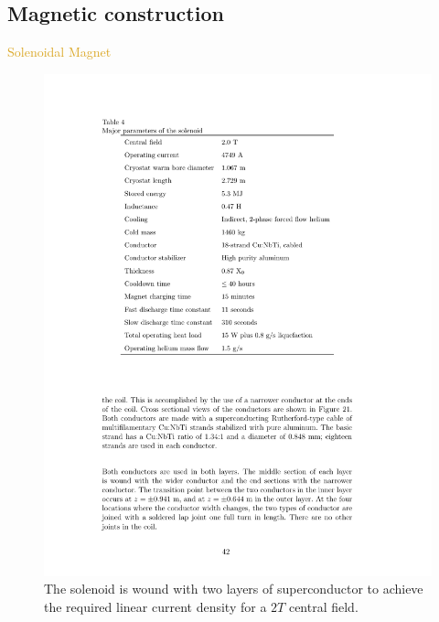 \subsection{Magnetic construction}
\begin{frame}{\textcolor{Goldenrod}{Solenoidal Magnet }}
    \begin{figure}[h]
      \centering
      \includegraphics[height=0.6\textheight]{./Images/25_magnet_solonoid.pdf}
      \caption*{The solenoid is wound with two layers of superconductor to achieve the required
        linear current density for a $2 T$ central field.}
    \end{figure}
    
\end{frame}

